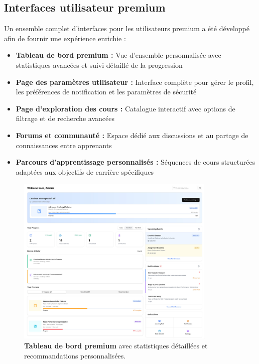 \subsection{Interfaces utilisateur premium}

Un ensemble complet d'interfaces pour les utilisateurs premium a été développé afin de fournir une expérience enrichie :

\begin{itemize}
    \item \textbf{Tableau de bord premium :} Vue d'ensemble personnalisée avec statistiques avancées et suivi détaillé de la progression
    \item \textbf{Page des paramètres utilisateur :} Interface complète pour gérer le profil, les préférences de notification et les paramètres de sécurité
    \item \textbf{Page d'exploration des cours :} Catalogue interactif avec options de filtrage et de recherche avancées
    \item \textbf{Forums et communauté :} Espace dédié aux discussions et au partage de connaissances entre apprenants
    \item \textbf{Parcours d'apprentissage personnalisés :} Séquences de cours structurées adaptées aux objectifs de carrière spécifiques
\end{itemize}

\begin{figure}[H]
  \centering
  \includegraphics[width=0.85\textwidth,keepaspectratio]{old-reports/week_4_img/dashboard.jpeg}
  \caption{\textbf{Tableau de bord premium} avec statistiques détaillées et recommandations personnalisées.}
  \label{fig:premium_dashboard}
\end{figure}

